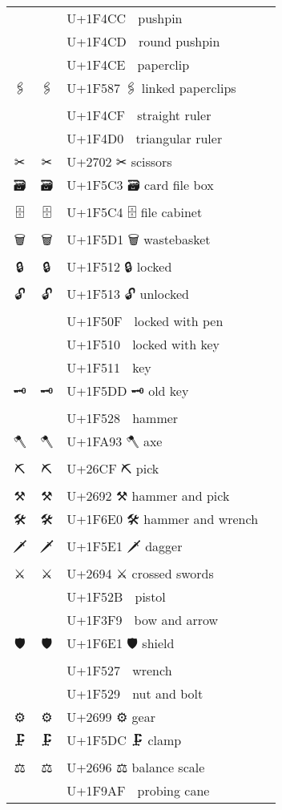 \documentclass[a4paper,12pt]{article}
\newcommand{\fontA}[1]{{\fontspec[RawFeature={mode=harf,+dist,+ccmp}]{Segoe UI Emoji} #1}}
\newcommand{\fontB}[1]{{\fontspec[RawFeature={mode=harf,+dist,+ccmp}]{Noto Color Emoji} #1}}
\begin{document}
\begin{longtable}[c]{ccp{0.8\linewidth}}
\fontA{📌}&\fontB{📌}&U+1F4CC 📌 pushpin\\
\fontA{📍}&\fontB{📍}&U+1F4CD 📍 round pushpin\\
\fontA{📎}&\fontB{📎}&U+1F4CE 📎 paperclip\\
\fontA{🖇}&\fontB{🖇}&U+1F587 🖇 linked paperclips\\
\fontA{📏}&\fontB{📏}&U+1F4CF 📏 straight ruler\\
\fontA{📐}&\fontB{📐}&U+1F4D0 📐 triangular ruler\\
\fontA{✂}&\fontB{✂}&U+2702 ✂ scissors\\
\fontA{🗃}&\fontB{🗃}&U+1F5C3 🗃 card file box\\
\fontA{🗄}&\fontB{🗄}&U+1F5C4 🗄 file cabinet\\
\fontA{🗑}&\fontB{🗑}&U+1F5D1 🗑 wastebasket\\
\fontA{🔒}&\fontB{🔒}&U+1F512 🔒 locked\\
\fontA{🔓}&\fontB{🔓}&U+1F513 🔓 unlocked\\
\fontA{🔏}&\fontB{🔏}&U+1F50F 🔏 locked with pen\\
\fontA{🔐}&\fontB{🔐}&U+1F510 🔐 locked with key\\
\fontA{🔑}&\fontB{🔑}&U+1F511 🔑 key\\
\fontA{🗝}&\fontB{🗝}&U+1F5DD 🗝 old key\\
\fontA{🔨}&\fontB{🔨}&U+1F528 🔨 hammer\\
\fontA{🪓}&\fontB{🪓}&U+1FA93 🪓 axe\\
\fontA{⛏}&\fontB{⛏}&U+26CF ⛏ pick\\
\fontA{⚒}&\fontB{⚒}&U+2692 ⚒ hammer and pick\\
\fontA{🛠}&\fontB{🛠}&U+1F6E0 🛠 hammer and wrench\\
\fontA{🗡}&\fontB{🗡}&U+1F5E1 🗡 dagger\\
\fontA{⚔}&\fontB{⚔}&U+2694 ⚔ crossed swords\\
\fontA{🔫}&\fontB{🔫}&U+1F52B 🔫 pistol\\
\fontA{🏹}&\fontB{🏹}&U+1F3F9 🏹 bow and arrow\\
\fontA{🛡}&\fontB{🛡}&U+1F6E1 🛡 shield\\
\fontA{🔧}&\fontB{🔧}&U+1F527 🔧 wrench\\
\fontA{🔩}&\fontB{🔩}&U+1F529 🔩 nut and bolt\\
\fontA{⚙}&\fontB{⚙}&U+2699 ⚙ gear\\
\fontA{🗜}&\fontB{🗜}&U+1F5DC 🗜 clamp\\
\fontA{⚖}&\fontB{⚖}&U+2696 ⚖ balance scale\\
\fontA{🦯}&\fontB{🦯}&U+1F9AF 🦯 probing cane\\

\end{longtable}
\end{document}

